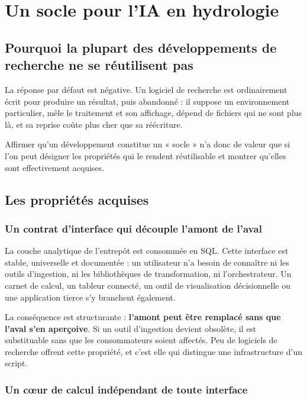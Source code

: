 \chapter{Un socle pour l'IA en hydrologie}
\label{ch:socle}


\section{Pourquoi la plupart des développements de recherche ne se réutilisent pas}

La réponse par défaut est négative. Un logiciel de recherche est ordinairement écrit pour produire un résultat, puis abandonné : il
suppose un environnement particulier, mêle le traitement et son affichage, dépend de fichiers
qui ne sont plus là, et sa reprise coûte plus cher que sa réécriture.

Affirmer qu'un développement constitue un « socle » n'a donc de valeur que si l'on peut désigner
les propriétés qui le rendent réutilisable et montrer qu'elles sont effectivement acquises.

\section{Les propriétés acquises}

\subsection{Un contrat d'interface qui découple l'amont de l'aval}

La couche analytique de l'entrepôt est consommée en SQL. Cette interface est stable, universelle
et documentée : un utilisateur n'a besoin de connaître ni les outils d'ingestion, ni les
bibliothèques de transformation, ni l'orchestrateur. Un carnet de calcul, un tableur connecté, un
outil de visualisation décisionnelle ou une application tierce s'y branchent également.

La conséquence est structurante : \textbf{l'amont peut être remplacé sans que l'aval s'en
aperçoive}. Si un outil d'ingestion devient obsolète, il est substituable sans que les
consommateurs soient affectés. Peu de logiciels de recherche offrent cette propriété, et c'est
elle qui distingue une infrastructure d'un script.

\subsection{Un cœur de calcul indépendant de toute interface}

